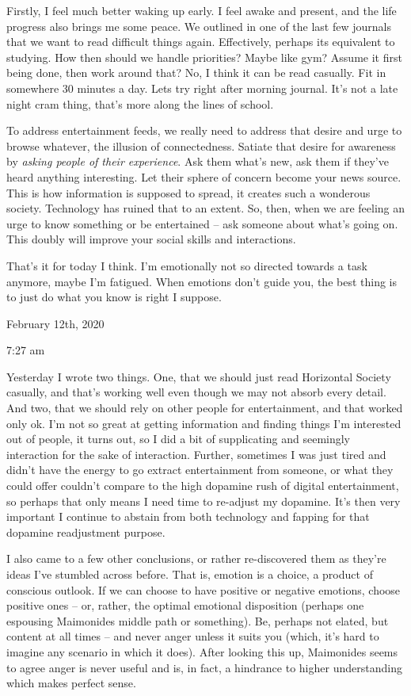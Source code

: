 Firstly, I feel much better waking up early. I feel awake and present,
and the life progress also brings me some peace. We outlined in one of
the last few journals that we want to read difficult things again.
Effectively, perhaps its equivalent to studying. How then should we
handle priorities? Maybe like gym? Assume it first being done, then work
around that? No, I think it can be read casually. Fit in somewhere 30
minutes a day. Lets try right after morning journal. It's not a late
night cram thing, that's more along the lines of school.

To address entertainment feeds, we really need to address that desire
and urge to browse whatever, the illusion of connectedness. Satiate that
desire for awareness by \emph{asking people of their experience}. Ask
them what's new, ask them if they've heard anything interesting. Let
their sphere of concern become your news source. This is how information
is supposed to spread, it creates such a wonderous society. Technology
has ruined that to an extent. So, then, when we are feeling an urge to
know something or be entertained -- ask someone about what's going on.
This doubly will improve your social skills and interactions.

That's it for today I think. I'm emotionally not so directed towards a
task anymore, maybe I'm fatigued. When emotions don't guide you, the
best thing is to just do what you know is right I suppose.

\bigskip
\bigskip
February 12th, 2020

7:27 am

Yesterday I wrote two things. One, that we should just read Horizontal
Society casually, and that's working well even though we may not absorb
every detail. And two, that we should rely on other people for
entertainment, and that worked only ok. I'm not so great at getting
information and finding things I'm interested out of people, it turns
out, so I did a bit of supplicating and seemingly interaction for the
sake of interaction. Further, sometimes I was just tired and didn't have
the energy to go extract entertainment from someone, or what they could
offer couldn't compare to the high dopamine rush of digital
entertainment, so perhaps that only means I need time to re-adjust my
dopamine. It's then very important I continue to abstain from both
technology and fapping for that dopamine readjustment purpose.

\qquad I also came to a few other conclusions, or rather re-discovered
them as they're ideas I've stumbled across before. That is, emotion is a
choice, a product of conscious outlook. If we can choose to have
positive or negative emotions, choose positive ones -- or, rather, the
optimal emotional disposition (perhaps one espousing Maimonides middle
path or something). Be, perhaps not elated, but content at all times --
and never anger unless it suits you (which, it's hard to imagine any
scenario in which it does). After looking this up, Maimonides seems to
agree anger is never useful and is, in fact, a hindrance to higher
understanding which makes perfect sense.

